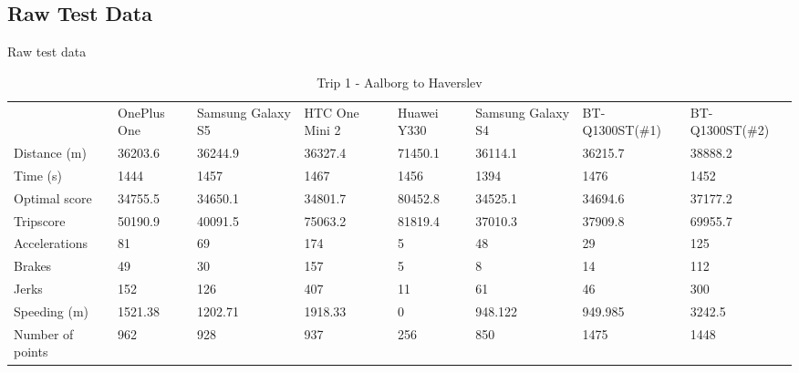 \subsection*{Raw Test Data}\label{app:rawtestdata}
Raw test data
\begin{table*}[tb]
\centering
\caption{Trip 1 - Aalborg to Haverslev}
\label{my-label}
\begin{tabular}{llllllll}
                 & OnePlus One & Samsung Galaxy S5 & HTC One Mini 2 & Huawei Y330 & Samsung Galaxy S4 & BT-Q1300ST(\#1) & BT-Q1300ST(\#2) \\
Distance (m)     & 36203.6     & 36244.9           & 36327.4        & 71450.1     & 36114.1           & 36215.7         & 38888.2         \\
Time (s)         & 1444        & 1457              & 1467           & 1456        & 1394              & 1476            & 1452            \\
Optimal score    & 34755.5     & 34650.1           & 34801.7        & 80452.8     & 34525.1           & 34694.6         & 37177.2         \\
Tripscore        & 50190.9     & 40091.5           & 75063.2        & 81819.4     & 37010.3           & 37909.8         & 69955.7         \\
Accelerations    & 81          & 69                & 174            & 5           & 48                & 29              & 125             \\
Brakes           & 49          & 30                & 157            & 5           & 8                 & 14              & 112             \\
Jerks            & 152         & 126               & 407            & 11          & 61                & 46              & 300             \\
Speeding (m)     & 1521.38     & 1202.71           & 1918.33        & 0           & 948.122           & 949.985         & 3242.5          \\
Number of points & 962         & 928               & 937            & 256         & 850               & 1475            & 1448           
\end{tabular}
\end{table*}


